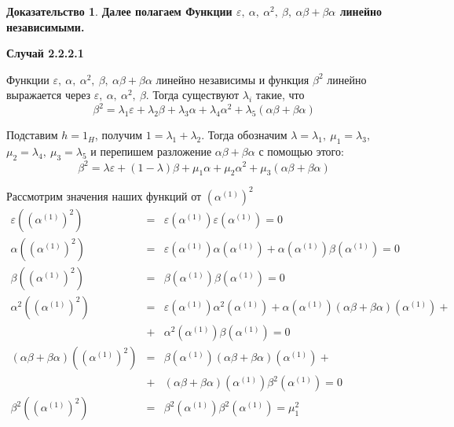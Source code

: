 \documentclass[a4paper, 12pt]{article}
\theoremstyle{definition}
\newtheorem*{prof}{\hspace*{\parindent}Доказательство}
\begin{document}
\begin{prof}
    \textbf{Далее полагаем Функции $\varepsilon,\ \alpha,\ \alpha^2,\ \beta,\ \alpha\beta+\beta\alpha$ линейно независимыми.}

    \textbf{Случай 2.2.2.1}
    
    Функции $\varepsilon,\ \alpha,\ \alpha^2,\ \beta,\ \alpha\beta+\beta\alpha$ линейно независимы и функция $\beta^2$ линейно выражается через $\varepsilon,\ \alpha,\ \alpha^2,\ \beta$.
    Тогда существуют $\lambda_i$ такие, что \[
    \beta^2= \lambda_1\varepsilon+\lambda_2\beta +\lambda_3\alpha+\lambda_4\alpha^2 + \lambda_5(\alpha\beta+\beta\alpha)
     \]

    Подставим $h = 1_H$, получим $1 = \lambda_1+\lambda_2$. Тогда обозначим $\lambda = \lambda_1,\ {\mu_1 = \lambda_3,}$ ${\mu_2 = \lambda_4},\ {\mu_3 = \lambda_5}$ и перепишем разложение $\alpha\beta+\beta\alpha$ с помощью этого: 
    \[
    \beta^2 = \lambda\varepsilon + (1-\lambda)\beta+\mu_1\alpha+\mu_2\alpha^2 +\mu_3(\alpha\beta+\beta\alpha)
    \]

    Рассмотрим значения наших функций от $\left(\alpha^{(1)}\right)^2$
    \begin{eqnarray*}
    \varepsilon\left(\left(\alpha^{(1)}\right)^2\right) &=& 
    \varepsilon\left(\alpha^{(1)}\right)\varepsilon\left(\alpha^{(1)}\right) = 0\\
    \alpha\left(\left(\alpha^{(1)}\right)^2\right) &=&
    \varepsilon\left(\alpha^{(1)}\right)\alpha\left(\alpha^{(1)}\right)+\alpha\left(\alpha^{(1)}\right)\beta\left(\alpha^{(1)}\right) = 0\\
    \beta\left(\left(\alpha^{(1)}\right)^2\right) &=&
    \beta\left(\alpha^{(1)}\right)\beta\left(\alpha^{(1)}\right) = 0\\
    \alpha^2\left(\left(\alpha^{(1)}\right)^2\right) &=&
    \varepsilon\left(\alpha^{(1)}\right)\alpha^2\left(\alpha^{(1)}\right)+
    \alpha\left(\alpha^{(1)}\right)(\alpha\beta+\beta\alpha)\left(\alpha^{(1)}\right)+\\
    &+& \alpha^2\left(\alpha^{(1)}\right)\beta\left(\alpha^{(1)}\right) = 0\\
    (\alpha\beta+\beta\alpha)\left(\left(\alpha^{(1)}\right)^2\right) &=&
    \beta\left(\alpha^{(1)}\right)(\alpha\beta+\beta\alpha)\left(\alpha^{(1)}\right)+\\
    &+&(\alpha\beta+\beta\alpha)\left(\alpha^{(1)}\right)\beta^2\left(\alpha^{(1)}\right) = 0\\
    \beta^2\left(\left(\alpha^{(1)}\right)^2\right) &=& \beta^2\left(\alpha^{(1)}\right)\beta^2\left(\alpha^{(1)}\right) = \mu_1^2\\
    \end{eqnarray*}


\end{prof}
\end{document}
